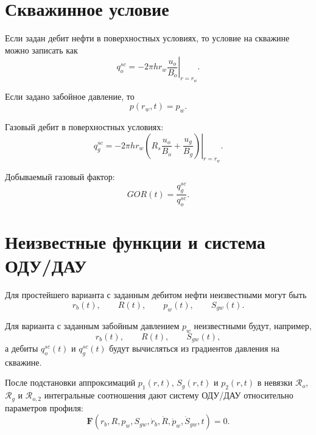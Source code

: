 \documentclass[12pt,a4paper]{article}
\begin{document}
\section{Скважинное условие}

Если задан дебит нефти в поверхностных условиях, то условие на скважине можно записать как
\begin{equation}
    q_o^{sc}
    =
    -2\pi h r_w
    \left.
    \frac{u_o}{B_o}
    \right|_{r=r_w}.
\end{equation}

Если задано забойное давление, то
\begin{equation}
    p(r_w,t)=p_w.
\end{equation}

Газовый дебит в поверхностных условиях:
\begin{equation}
    q_g^{sc}
    =
    -2\pi h r_w
    \left.
    \left(
        R_s \frac{u_o}{B_o}
        +
        \frac{u_g}{B_g}
    \right)
    \right|_{r=r_w}.
\end{equation}

Добываемый газовый фактор:
\begin{equation}
    GOR(t)=\frac{q_g^{sc}}{q_o^{sc}}.
\end{equation}

\section{Неизвестные функции и система ОДУ/ДАУ}

Для простейшего варианта с заданным дебитом нефти неизвестными могут быть
\begin{equation}
    r_b(t), \qquad R(t), \qquad p_w(t), \qquad S_{gw}(t).
\end{equation}

Для варианта с заданным забойным давлением $p_w$ неизвестными будут, например,
\begin{equation}
    r_b(t), \qquad R(t), \qquad S_{gw}(t),
\end{equation}
а дебиты $q_o^{sc}(t)$ и $q_g^{sc}(t)$ будут вычисляться из градиентов давления на скважине.

После подстановки аппроксимаций $p_1(r,t)$, $S_g(r,t)$ и $p_2(r,t)$ в невязки $\mathcal{R}_o$, $\mathcal{R}_g$ и $\mathcal{R}_{o,2}$ интегральные соотношения дают систему ОДУ/ДАУ относительно параметров профиля:
\begin{equation}
    \mathbf{F}
    \left(
        r_b,
        R,
        p_w,
        S_{gw},
        \dot r_b,
        \dot R,
        \dot p_w,
        \dot S_{gw},
        t
    \right)
    =0.
\end{equation}
\end{document}
